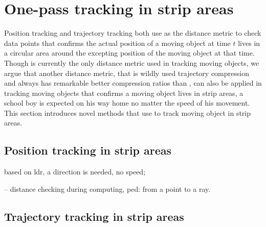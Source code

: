 

\section{One-pass tracking in strip areas}
\label{sec:strip}


Position tracking and trajectory tracking both use \sed as the distance metric to check data points that confirms the actual position of a moving object at time $t$ lives in a circular area around the excepting position of the moving object at that time.
Though \sed is currently the only distance metric used in tracking moving objects, we argue that another distance metric, \ped that is wildly used trajectory compression and always has remarkable better compression ratios than \sed, can also be applied in tracking moving objects that confirms a moving object lives in strip areas, \eg a school boy is expected on his way home no matter the speed of his movement.
This section introduces novel methods that use \ped to track moving object in strip areas.

\subsection{Position tracking in strip areas}
based on ldr, a direction is needed, no speed;
  
  --  distance checking during computing, ped: from a point to a ray.
  



\subsection{Trajectory tracking in strip areas}


